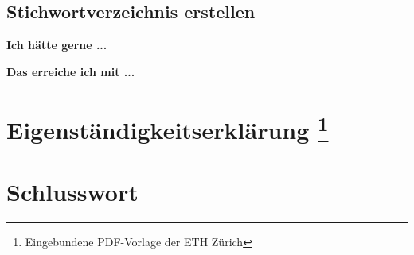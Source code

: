 \documentclass[twoside, 
               a4paper, 
              10pt, 
               parskip=full, 
               sectionentrydots=true, 
               listof=totoc, 
               listof=entryprefix,
               numbers=endperiod]{scrartcl}
\begin{document}
\newpage
\subsection{Stichwortverzeichnis erstellen}
{\textbf {Ich hätte gerne ...}}
 
\begin{miniSeite}[colbacktitle=black!35!white,title=Ausdruck]

\end{miniSeite}


\newpage
{\textbf {Das erreiche ich mit ...}}
 
\begin{miniSeite}[colbacktitle=black!35!white,title=\LaTeX-Code]

\end{miniSeite}




\newpage
\thispagestyle{empty}
\mbox{}

\newpage
{}
\renewcommand{\indexname}{Stichwortverzeichnis \bigskip}\label{index}
\printindex




\newpage
\thispagestyle{empty}
\mbox{}

\newpage
{}
\section*{Eigenständigkeitserklärung
\footnote{Eingebundene PDF-Vorlage der ETH Zürich} 
\label{eigenstaendigkeitserklaerung}}
\begin{figure}

\end{figure}




\newpage
\thispagestyle{empty}
\mbox{}

\newpage
{}
\section*{Schlusswort}

\end{document}
